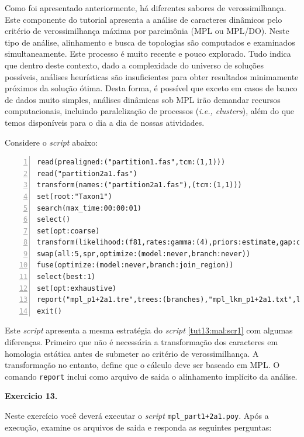 \begin{refsection}
Como foi apresentado anteriormente, há diferentes sabores de verossimilhança. Este componente do tutorial apresenta a análise de caracteres dinâmicos pelo critério de verossimilhança máxima por parcimônia (MPL ou MPL/DO). Neste tipo de análise, alinhamento e busca de topologias são computados e examinados simultaneamente. Este processo é muito recente e pouco explorado. Tudo indica que dentro deste contexto, dado a complexidade do universo de soluções possíveis, análises heurísticas são insuficientes para obter resultados minimamente próximos da solução ótima. Desta forma, é possível que exceto em casos de banco de dados muito simples, análises dinâmicas sob MPL irão demandar recursos computacionais, incluindo paralelização de processos (\textit{i.e., clusters}), além do que temos disponíveis para o dia a dia de nossas atividades.

	Considere o \textit{script} abaixo:

\scriptsize
\begin{lstlisting}[caption={mpl\_part1+2a1.poy.},label=tut13:mpl:scr1, numbers=left, numberblanklines=false]
read(prealigned:("partition1.fas",tcm:(1,1)))
read("partition2a1.fas")
transform(names:("partition2a1.fas"),(tcm:(1,1)))
set(root:"Taxon1")
search(max_time:00:00:01)
select()
set(opt:coarse)
transform(likelihood:(f81,rates:gamma:(4),priors:estimate,gap:coupled,mpl))
swap(all:5,spr,optimize:(model:never,branch:never))
fuse(optimize:(model:never,branch:join_region))
select(best:1)
set(opt:exhaustive)
report("mpl_p1+2a1.tre",trees:(branches),"mpl_lkm_p1+2a1.txt",lkmodel,"mpl_p1+2a1_ia.fas",fasta)
exit()
\end{lstlisting}
\normalsize

Este \textit{script} apresenta a mesma estratégia do \textit{script} \ref{tut13:mal:scr1} com algumas diferenças. Primeiro que não é necessária a transformação dos caracteres em homologia estática antes de submeter ao critério de verossimilhança. A transformação no entanto, define que o cálculo deve ser baseado em MPL. O comando \texttt{report} inclui como arquivo de saida o alinhamento implícito da análise.\\


\begin{blackBlock}{\textbf{Exercicio 13.}}\label{tut13:ex:13.7}

Neste exercício você deverá executar o \textit{script} \texttt{mpl\_part1+2a1.poy}. Após a execução, examine os arquivos de saida e responda as seguintes perguntas:


\end{blackBlock}
\end{refsection}
